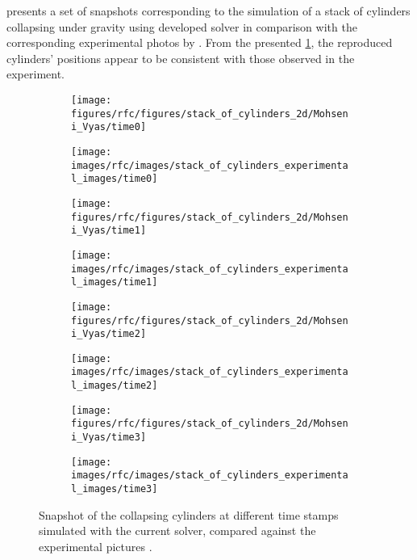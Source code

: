  presents a set of snapshots
corresponding to the simulation of a stack of cylinders collapsing under gravity
using developed solver in comparison with the corresponding experimental photos
by \parencite{zhang_simulation_2009}. From the presented
\cref{fig:snapshots-stack-of-cylinders}, the reproduced cylinders' positions
appear to be consistent with those observed in the experiment.
\begin{figure}[!htpb]
  \centering
  \begin{subfigure}{0.48\textwidth}
    \centering
    \texttt{[image: figures/rfc/figures/stack\_of\_cylinders\_2d/Mohseni\_Vyas/time0]}
  \end{subfigure}
  \begin{subfigure}{0.48\textwidth}
    \centering
    \texttt{[image: images/rfc/images/stack\_of\_cylinders\_experimental\_images/time0]}
  \end{subfigure}

  \begin{subfigure}{0.48\textwidth}
    \centering
    \texttt{[image: figures/rfc/figures/stack\_of\_cylinders\_2d/Mohseni\_Vyas/time1]}
  \end{subfigure}
  \begin{subfigure}{0.48\textwidth}
    \centering
    \texttt{[image: images/rfc/images/stack\_of\_cylinders\_experimental\_images/time1]}
  \end{subfigure}

  \begin{subfigure}{0.48\textwidth}
    \centering
    \texttt{[image: figures/rfc/figures/stack\_of\_cylinders\_2d/Mohseni\_Vyas/time2]}
  \end{subfigure}
  \begin{subfigure}{0.48\textwidth}
    \centering
    \texttt{[image: images/rfc/images/stack\_of\_cylinders\_experimental\_images/time2]}
  \end{subfigure}

  \begin{subfigure}{0.48\textwidth}
    \centering
    \texttt{[image: figures/rfc/figures/stack\_of\_cylinders\_2d/Mohseni\_Vyas/time3]}
  \end{subfigure}
  \begin{subfigure}{0.48\textwidth}
    \centering
    \texttt{[image: images/rfc/images/stack\_of\_cylinders\_experimental\_images/time3]}
  \end{subfigure}
  \caption{Snapshot of the collapsing cylinders at different time stamps
    simulated with the current solver, compared against the experimental
    pictures \parencite{zhang_simulation_2009}.}
\label{fig:snapshots-stack-of-cylinders}
\end{figure}
